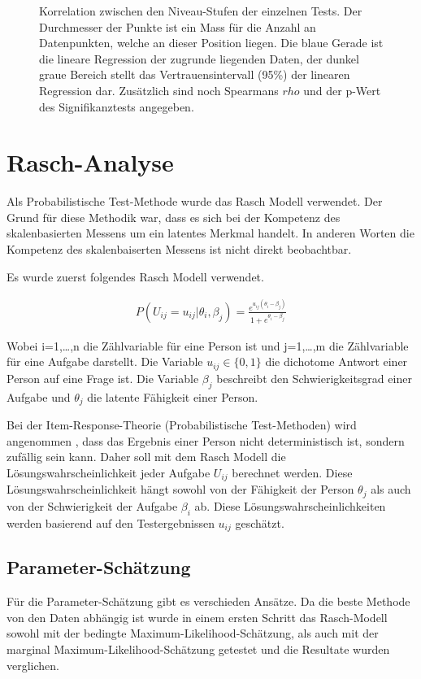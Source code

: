\begin{figure}[htbp]
\caption{Korrelation zwischen den Niveau-Stufen der einzelnen Tests. Der Durchmesser der Punkte ist ein Mass für die Anzahl an Datenpunkten, welche an dieser Position liegen. Die blaue Gerade ist die lineare Regression der zugrunde liegenden Daten, der dunkel graue Bereich stellt das Vertrauensintervall (95\%) der linearen Regression dar. Zusätzlich sind noch Spearmans $rho$ und der p-Wert des Signifikanztests angegeben.}
\label{fig:corLev}
\end{figure}


\clearpage
\section{Rasch-Analyse}

Als Probabilistische Test-Methode wurde das Rasch Modell verwendet. Der Grund für diese Methodik war, dass es sich bei der Kompetenz des skalenbasierten Messens um ein latentes Merkmal handelt. In anderen Worten die Kompetenz des skalenbaiserten Messens ist nicht direkt beobachtbar.

Es wurde zuerst folgendes Rasch Modell verwendet.

\begin{eqnarray}
P(U_{ij}=u_{ij}|\theta_i,\beta_j) = \frac{e^{u_{ij}(\theta_i-\beta_j)}}{1+e^{\theta_i-\beta_j}}
\end{eqnarray}

Wobei i=1,…,n die Zählvariable für eine Person ist und j=1,…,m die Zählvariable für eine Aufgabe darstellt. Die Variable $u_{ij} \in \{0,1\}$ die dichotome Antwort einer Person auf eine Frage ist. Die Variable $\beta_j$ beschreibt den Schwierigkeitsgrad einer Aufgabe und $\theta_j$ die latente Fähigkeit einer Person.

Bei der Item-Response-Theorie (Probabilistische Test-Methoden) wird angenommen , dass das Ergebnis einer Person nicht deterministisch ist, sondern zufällig sein kann. Daher soll mit dem Rasch Modell die Lösungswahrscheinlichkeit jeder Aufgabe $U_{ij}$ berechnet werden. Diese Lösungswahrscheinlichkeit hängt sowohl von der Fähigkeit der Person $\theta_j$ als auch von der Schwierigkeit der Aufgabe $\beta_i$ ab. Diese Lösungswahrscheinlichkeiten werden basierend auf den Testergebnissen $u_{ij}$ geschätzt.

\subsection{Parameter-Schätzung}
Für die Parameter-Schätzung gibt es verschieden Ansätze. Da die beste Methode von den Daten abhängig ist wurde in einem ersten Schritt das Rasch-Modell sowohl mit der bedingte Maximum-Likelihood-Schätzung, als auch mit der marginal Maximum-Likelihood-Schätzung getestet und die Resultate wurden verglichen. 

